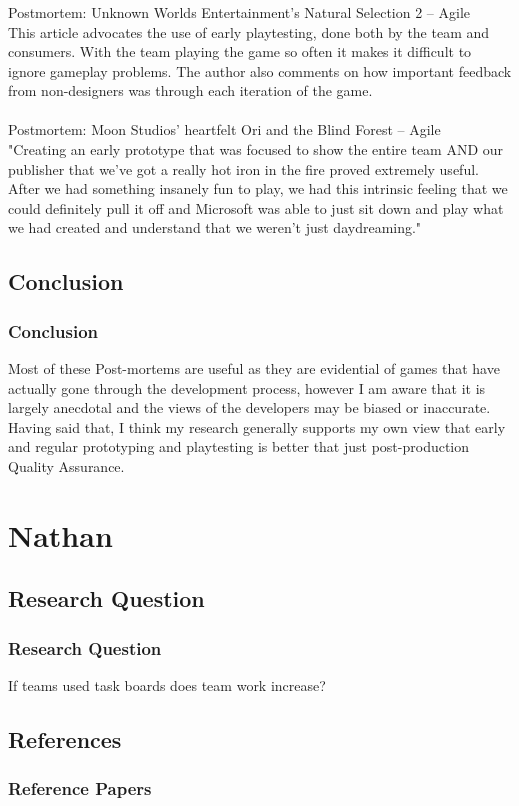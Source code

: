 \documentclass{beamer}
\begin{document}
\begin{frame}
\frametitle{}
Postmortem: Unknown Worlds Entertainment's Natural Selection 2 – Agile\\
This article advocates the use of early playtesting, done both by the team and consumers. With the team playing the game so often it makes it difficult to ignore gameplay problems. The author also comments on how important feedback from non-designers was through each iteration of the game.
\\~\\
Postmortem: Moon Studios' heartfelt Ori and the Blind Forest – Agile\\
"Creating an early prototype that was focused to show the entire team AND our publisher that we’ve got a really hot iron in the fire proved extremely useful. After we had something insanely fun to play, we had this intrinsic feeling that we could definitely pull it off and Microsoft was able to just sit down and play what we had created and understand that we weren’t just daydreaming."
\end{frame}

\subsection{Conclusion}
\begin{frame}
\frametitle{Conclusion}
Most of these Post-mortems are useful as they are evidential of games that have actually gone through the development process, however I am aware that it is largely anecdotal and the views of the developers may be biased or inaccurate.\\ Having said that, I think my research generally supports my own view that early and regular prototyping and playtesting is better that just post-production Quality Assurance.
\end{frame}

\section{Nathan}
\subsection{Research Question}
\begin{frame}
\frametitle{Research Question}
If teams used task boards does team work increase?
\end{frame}

\subsection{References}
\begin{frame}
\frametitle{Reference Papers}

\end{frame}
\end{document}
